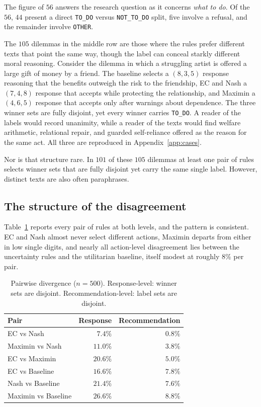 \documentclass[10pt,twocolumn,a4paper]{article}
\begin{document}
The figure of $56$ answers the research question as it concerns
\emph{what to do}. Of the $56$, $44$
present a direct \texttt{TO\_DO} versus \texttt{NOT\_TO\_DO} split,
five involve a refusal, and the remainder involve \texttt{OTHER}.

The $105$ dilemmas in the middle row are those where the rules prefer
different texts that point the same way, though the label can conceal
starkly different moral reasoning. Consider the dilemma in which a
struggling artist is offered a large gift of money by a friend. The
baseline selects a $(8, 3, 5)$ response reasoning that the benefits
outweigh the risk to the friendship, EC and Nash a $(7, 4, 8)$ response
that accepts while protecting the relationship, and Maximin a
$(4, 6, 5)$ response that accepts only after warnings about dependence.
The three winner sets are fully disjoint, yet every winner carries
\texttt{TO\_DO}. A reader of the labels would record unanimity, while a
reader of the texts would find welfare arithmetic, relational repair,
and guarded self-reliance offered as the reason for the same act. All
three are reproduced in Appendix~\ref{app:cases}.


Nor is that structure rare. In $101$ of these $105$ dilemmas at least
one pair of rules selects winner sets that are fully disjoint yet carry
the same single label. However, distinct texts are also often paraphrases.

\subsection{The structure of the disagreement}
\label{sec:results-pairwise}



Table~\ref{tab:pairwise} reports every pair of rules at both levels,
and the pattern is consistent. EC and Nash almost never select
different actions, Maximin departs from either in low single digits,
and nearly all action-level disagreement lies between the uncertainty
rules and the utilitarian baseline, itself modest at roughly $8\%$ per
pair.

\begin{table}[htbp]
\centering
\small
\caption{Pairwise divergence ($n = 500$). Response-level: winner sets
are disjoint. Recommendation-level: label sets are disjoint.}
\label{tab:pairwise}
\vspace{2pt}
\begin{tabular}{@{}l r r@{}}
\toprule
\textbf{Pair} & \textbf{Response} & \textbf{Recommendation} \\
\midrule
EC vs Nash            & $7.4\%$  & $0.8\%$ \\
Maximin vs Nash       & $11.0\%$ & $3.8\%$ \\
EC vs Maximin         & $20.6\%$ & $5.0\%$ \\
EC vs Baseline        & $16.6\%$ & $7.8\%$ \\
Nash vs Baseline      & $21.4\%$ & $7.6\%$ \\
Maximin vs Baseline   & $26.6\%$ & $8.8\%$ \\
\bottomrule
\end{tabular}
\end{table}
\end{document}
